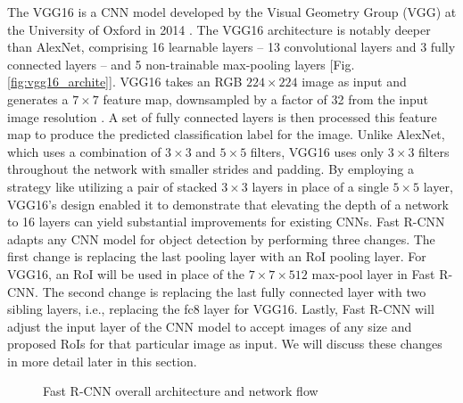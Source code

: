 The VGG16 is a CNN model developed by the Visual Geometry Group (VGG) at the University of Oxford in 2014 \cite{vgg16_2014}. The VGG16 architecture is notably deeper than AlexNet, comprising 16 learnable layers -- 13 convolutional layers and 3 fully connected layers -- and 5 non-trainable max-pooling layers [Fig. \ref{fig:vgg16_archite}]. VGG16 takes an RGB $224 \times 224$ image as input and generates a $7 \times 7$ feature map, downsampled by a factor of 32 from the input image resolution \cite{deconv_rcnn_2018}. A set of fully connected layers is then processed this feature map to produce the predicted classification label for the image. Unlike AlexNet, which uses a combination of $3 \times 3$ and $5 \times 5$ filters, VGG16 uses only $3 \times 3$ filters throughout the network with smaller strides and padding. By employing a strategy like utilizing a pair of stacked $3 \times 3$ layers in place of a single $5 \times 5$ layer, VGG16's design enabled it to demonstrate that elevating the depth of a network to 16 layers can yield substantial improvements for existing CNNs. Fast R-CNN adapts any CNN model for object detection by performing three changes. The first change is replacing the last pooling layer with an RoI pooling layer. For VGG16, an RoI will be used in place of the $7 \times 7 \times 512$ max-pool layer in Fast R-CNN. The second change is replacing the last fully connected layer with two sibling layers, i.e., replacing the fc8 layer for VGG16. Lastly, Fast R-CNN will adjust the input layer of the CNN model to accept images of any size and proposed RoIs for that particular image as input. We will discuss these changes in more detail later in this section.

\begin{figure}[!ht]
    \centering

    \caption{Fast R-CNN overall architecture and network flow} \label{fig:fast_rcnn_archite_flowc}
\end{figure}

